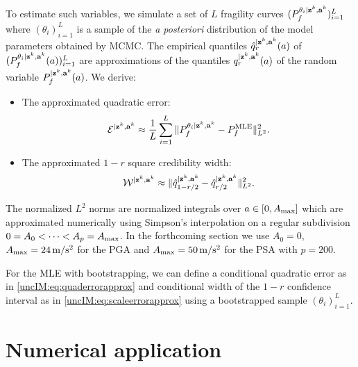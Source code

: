     To estimate such variables, we simulate a set of $L$ %
    fragility curves $( P_f^{\theta_i|\mbf z^k,\mbf a^k})_{i=1}^L\vspace*{-4pt}$ where $(\theta_i)_{i=1}^L$ is a sample of the \emph{a posteriori} distribution of the model parameters obtained by MCMC. The   empirical quantiles $\hat q_r^{|\mathbf{z}^k,\mathbf{a}^k}(a)$  of $( P_f^{\theta_i|\mathbf{z}^k,\mathbf{a}^k}(a))_{i=1}^L$  are approximations of the quantiles $q_r^{|\mathbf{z}^k,\mathbf{a}^k}(a)$ of the random variable $P_f^{|\mathbf{z}^k,\mathbf{a}^k}(a)$.
    We derive\vspace*{-4pt}:
        \begin{itemize}
            \item The approximated quadratic error:
                \begin{equation} \label{uncIM:eq:quaderrorapprox}
                    \mathcal{E}^{|\mathbf{z}^k,\mathbf{a}^k} \approx\frac{1}{ L}\sum_{i=1}^L\| P_{f}^{\theta_i|\mathbf{z}^k,\mathbf{a}^k} - P_f^{\mathrm{MLE}} \|_{L^2}^2.
                \end{equation}
            \item The approximated $1-r$ square credibility width: %
                \begin{equation} \label{uncIM:eq:scaleerrorapprox}
                    \mathcal{W}^{|\mathbf{z}^k,\mathbf{a}^k} \approx \|\hat q_{1-{r/2}}^{|\mathbf{z}^k,\mathbf{a}^k} - \hat q_{{r/2}}^{|\mathbf{z}^k,\mathbf{a}^k} \|_{L^2}^2.
                \end{equation}
        \end{itemize}
        The normalized $L^2$ norms are normalized integrals over $a\in [0,A_{\rm max}]$ which are approximated numerically using Simpson's interpolation on a regular subdivision $0=A_0<\dots<A_p=A_{\rm max}$. In the forthcoming section we use   $A_0=0$, $A_{\rm max}=24\,\mathrm{m/s^2}$ for the PGA and $A_{\rm max}=50\,\mathrm{m/s^2}$ for the PSA with $p=200$.

        For the MLE with bootstrapping, we can define a conditional quadratic error as in \cref{uncIM:eq:quaderrorapprox} and conditional width of the $1-r$ confidence interval as in \cref{uncIM:eq:scaleerrorapprox} using a bootstrapped sample $(\theta_i)_{i=1}^L$.


\section{Numerical application} \label{uncIM:sec:application}

